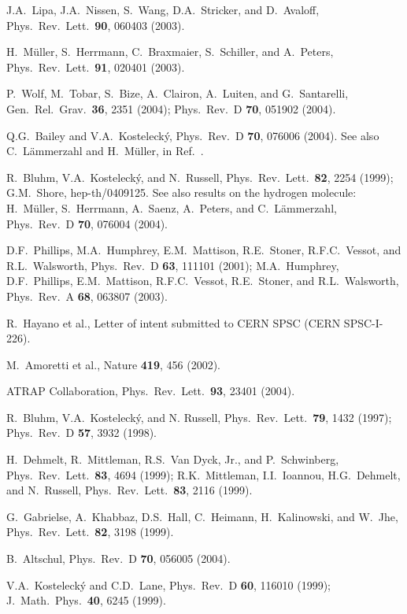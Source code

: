 \documentclass[twocolumn]{revtex4}
\begin{document}
\begin{thebibliography}{99}
J.A.\ Lipa, J.A.\ Nissen, S.\ Wang, D.A.\ Stricker, and D.\ Avaloff,
Phys.\ Rev.\ Lett.\ {\bf 90}, 060403 (2003).

H.\ M\"uller, S.\ Herrmann, C.\ Braxmaier, S.\ Schiller, and A.\ Peters,
Phys.\ Rev.\ Lett.\ {\bf 91}, 020401 (2003).

P.\ Wolf, M.\ Tobar, S.\ Bize, A.\ Clairon, A.\ Luiten, and G.\ Santarelli,
Gen.\ Rel.\ Grav.\ {\bf 36}, 2351 (2004);
Phys.\ Rev.\ D {\bf 70}, 051902 (2004).

Q.G.\ Bailey and V.A.\ Kosteleck\'y,
Phys.\ Rev.\ D {\bf 70}, 076006 (2004).
See also
C.\ L\"ammerzahl and H.\ M\"uller,
in Ref.\ \cite{cpt04}.

R.\ Bluhm, V.A.\ Kosteleck\'y, and N.\ Russell,
Phys.\ Rev.\ Lett.\ {\bf 82}, 2254 (1999);
G.M.\ Shore, hep-th/0409125.
See also results on the hydrogen molecule:
H.\ M\"uller, S.\ Herrmann, A.\ Saenz, A.\ Peters, and C.\ L\"ammerzahl,
Phys.\ Rev.\ D {\bf 70}, 076004 (2004).

D.F.\ Phillips, M.A.\ Humphrey, E.M.\ Mattison, R.E.\ Stoner, R.F.C.\ Vessot,
and R.L.\ Walsworth,
Phys.\ Rev.\ D {\bf 63}, 111101 (2001);
M.A.\ Humphrey, D.F.\ Phillips, E.M.\ Mattison, R.F.C.\ Vessot, R.E.\ Stoner,
and R.L.\ Walsworth,
Phys.\ Rev.\ A {\bf 68}, 063807 (2003).

R.\ Hayano et al., Letter of intent submitted to CERN SPSC
(CERN SPSC-I-226).

M.\ Amoretti et al., Nature {\bf 419}, 456 (2002).

ATRAP Collaboration,
Phys.\ Rev.\ Lett.\ {\bf 93}, 23401 (2004).

R.\ Bluhm, V.A.\ Kosteleck\'y, and N. Russell,
Phys.\ Rev.\ Lett.\ {\bf 79}, 1432 (1997);
Phys.\ Rev.\ D {\bf 57}, 3932 (1998).

H.\ Dehmelt, R.\ Mittleman, R.S.\ Van Dyck, Jr., and P.\ Schwinberg,
Phys.\ Rev.\ Lett.\ {\bf 83}, 4694 (1999);
R.K.\ Mittleman, I.I.\ Ioannou, H.G.\ Dehmelt, and N.\ Russell,
Phys.\ Rev.\ Lett.\ {\bf 83}, 2116 (1999).

G.\ Gabrielse, A.\ Khabbaz, D.S.\ Hall, C.\ Heimann, H.\ Kalinowski,
and W.\ Jhe,
Phys.\ Rev.\ Lett.\ {\bf 82}, 3198 (1999).

B.\ Altschul,
Phys.\ Rev.\ D {\bf 70}, 056005 (2004).

V.A.\ Kosteleck\'y and C.D.\ Lane,
Phys.\ Rev.\ D {\bf 60}, 116010 (1999);
J.\ Math.\ Phys.\  {\bf 40}, 6245 (1999).


\end{thebibliography}
\end{document}
